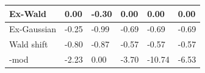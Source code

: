 \begin{tabular}{|l|l|l|l|l|l|}
\hline
Ex-Wald&0.00&-0.30&0.00&0.00&0.00\\\hline
Ex-Gaussian&-0.25&-0.99&-0.69&-0.69&-0.69\\\hline
Wald shift&-0.80&-0.87&-0.57&-0.57&-0.57\\\hline
\rocdd{}-mod&-2.23&0.00&-3.70&-10.74&-6.53\\\hline
\end{tabular}

